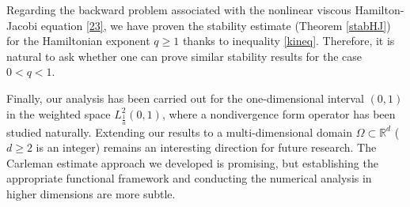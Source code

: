 \documentclass[reqno]{amsart}
\theoremstyle{plain}
\theoremstyle{remark}
\numberwithin{equation}{section}
\begin{document}
Regarding the backward problem associated with the nonlinear viscous Hamilton-Jacobi equation \eqref{23}, we have proven the stability estimate (Theorem \ref{stabHJ}) for the Hamiltonian exponent $q\ge 1$ thanks to inequality \eqref{kineq}. Therefore, it is natural to ask whether one can prove similar stability results for the case $0<q<1$.

Finally, our analysis has been carried out for the one-dimensional interval $(0,1)$ in the weighted space $L^2_{\frac{1}{a}}(0,1)$, where a nondivergence form operator has been studied naturally. Extending our results to a multi-dimensional domain $\Omega \subset \mathbb{R}^d$ ($d\ge 2$ is an integer) remains an interesting direction for future research. The Carleman estimate approach we developed is promising, but establishing the appropriate functional framework and conducting the numerical analysis in higher dimensions are more subtle.
\end{document}
